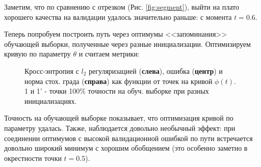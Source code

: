 \documentclass{article} %
\begin{document}
Заметим, что по сравнению с отрезком (Рис. \ref{fig:segment}), выйти на плато хорошего качества на валидации удалось значительно раньше: с момента $t=0.6$.

Теперь попробуем построить путь через оптимумы <<запоминания>> обучающей выборки, полученные через разные инициализации. Оптимизируем кривую по параметру $\theta$ и считаем метрики:
\begin{figure}[!ht]
    \centering
    \caption{Кросс-энтропия с $l_2$ регуляризацией (\textbf{слева}), ошибка (\textbf{центр}) и норма стох. града (\textbf{справа}) как функции от точек на кривой $\phi(t)$. 1 и 1' - точки 100\% точности на обуч. выборке при разных инициализациях.}
    \label{fig:pol_chain11}
\end{figure}

Точность на обучающей выборке показывает, что оптимизация кривой по параметру удалась. Также, наблюдается довольно необычный эффект: при соединении оптимумов с высокой валидационной ошибкой по пути встречается довольно широкий минимум с хорошим обобщением (это особенно заметно в окрестности точки $t=0.5$). 
\newpage
\end{document}
